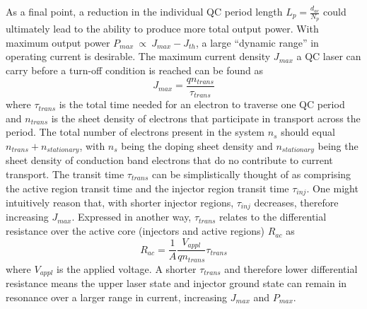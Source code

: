 As a final point, a reduction in the individual QC period length $L_p=\frac{d_{ac}}{N_p}$ could ultimately lead to the ability to produce more total output power.  With maximum output power $P_{max}~\propto~J_{max}-J_{th}$, a large ``dynamic range'' in operating current is desirable.  The maximum current density $J_{max}$ a QC laser can carry before a turn-off condition is reached can be found as \cite{Sirtori:JQE:1998} \cite{Aellen:JAP:2006}
\begin{equation}
J_{max} = \frac{q n_\textit{trans}}{\tau_\textit{trans}}
\end{equation}
where $\tau_\textit{trans}$ is the total time needed for an electron to traverse one QC period and $n_\textit{trans}$ is the sheet density of electrons that participate in transport across the period.  The total number of electrons present in the system $n_s$ should equal $n_\textit{trans}+n_\textit{stationary}$, with $n_s$ being the doping sheet density and $n_\textit{stationary}$ being the sheet density of conduction band electrons that do no contribute to current transport.  The transit time $\tau_\textit{trans}$ can be simplistically thought of as comprising the active region transit time and the injector region transit time $\tau_\textit{inj}$.  One might intuitively reason that, with shorter injector regions, $\tau_\textit{inj}$ decreases, therefore increasing $J_{max}$.  Expressed in another way, $\tau_\textit{trans}$ relates to the differential resistance over the active core (injectors and active regions) $R_{ac}$ as
\begin{equation}
R_{ac} = \frac{1}{A} \frac{V_{appl}}{q n_\textit{trans}} \tau_\textit{trans}
\end{equation}
where $V_{appl}$ is the applied voltage.  A shorter $\tau_\textit{trans}$ and therefore lower differential resistance means the upper laser state and injector ground state can remain in resonance over a larger range in current, increasing $J_{max}$ and $P_{max}$.


